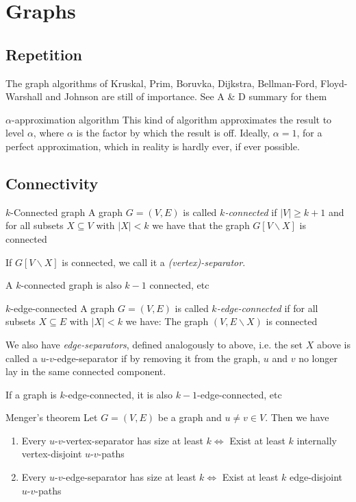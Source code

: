 \newsection
\section{Graphs}

\subsection{Repetition}
The graph algorithms of Kruskal, Prim, Boruvka, Dijkstra, Bellman-Ford, Floyd-Warshall and Johnson are still of importance. See A \& D summary for them

\begin{definition}[]{$\alpha$-approximation algorithm}
    This kind of algorithm approximates the result to level $\alpha$, where $\alpha$ is the factor by which the result is off. Ideally, $\alpha = 1$, for a perfect approximation, which in reality is hardly ever, if ever possible.
\end{definition}


\setcounter{subsection}{3}
\subsection{Connectivity}
\setcounter{all}{23}
\begin{definition}[]{$k$-Connected graph}
    A graph $G = (V, E)$ is called $k$\textit{-connected} if $|V| \geq k + 1$ and for all subsets $X \subseteq V$ with $|X| < k$ we have that the graph $G[V\backslash X]$ is connected
\end{definition}
If $G[V\backslash X]$ is  connected, we call it a \textit{(vertex)-separator}.

A $k$-connected graph is also $k - 1$ connected, etc

\begin{definition}[]{$k$-edge-connected}
    A graph $G = (V, E)$ is called $k$\textit{-edge-connected} if for all subsets $X \subseteq E$ with $|X| < k$ we have: The graph $(V, E\backslash X)$ is connected
\end{definition}
We also have \textit{edge-separators}, defined analogously to above, i.e. the set $X$ above is called a $u$-$v$-edge-separator if by removing it from the graph, $u$ and $v$ no longer lay in the same connected component.

If a graph is $k$-edge-connected, it is also $k - 1$-edge-connected, etc


\begin{theorem}[]{Menger's theorem}
    Let $G = (V, E)$ be a graph and $u \neq v \in V$. Then we have
    \begin{enumerate}
        \item Every $u$-$v$-vertex-separator has size at least $k \Leftrightarrow$ Exist at least $k$ internally vertex-disjoint $u$-$v$-paths
        \item Every $u$-$v$-edge-separator has size at least $k \Leftrightarrow$ Exist at least $k$ edge-disjoint $u$-$v$-paths
    \end{enumerate}
\end{theorem}


